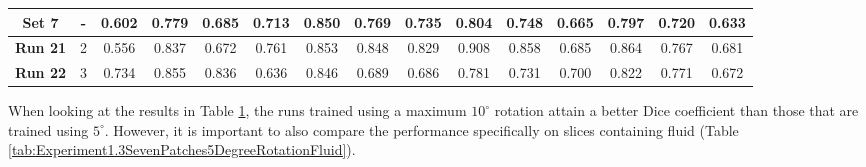 \begin{table}[!ht]
{\begin{tabular}{|c|c|ccc|ccc|ccc|c|c|c|c|}
		\hline
		
		\textbf{Set 7} & - & \multicolumn{1}{c|}{0.602} & \multicolumn{1}{c|}{0.779} & 0.685 & \multicolumn{1}{c|}{0.713} & \multicolumn{1}{c|}{0.850} & 0.769 & \multicolumn{1}{c|}{0.735} & \multicolumn{1}{c|}{0.804} & 0.748 & 0.665 & 0.797 & 0.720 & 0.633 \\
		
		\hline
		\hline
		
		\textbf{Run 21} & 2 & \multicolumn{1}{c|}{0.556} & \multicolumn{1}{c|}{0.837} & 0.672 & \multicolumn{1}{c|}{0.761} & \multicolumn{1}{c|}{0.853} & 0.848 & \multicolumn{1}{c|}{0.829} & \multicolumn{1}{c|}{0.908} & 0.858 & 0.685 & 0.864 & 0.767 & 0.681 \\

		\textbf{Run 22} & 3 & \multicolumn{1}{c|}{0.734} & \multicolumn{1}{c|}{0.855} & 0.836 & \multicolumn{1}{c|}{0.636} & \multicolumn{1}{c|}{0.846} & 0.689 & \multicolumn{1}{c|}{0.686} & \multicolumn{1}{c|}{0.781} & 0.731 & 0.700 & 0.822 & 0.771 & 0.672 \\

		\hline
			
	\end{tabular}}
	\label{tab:Experiment1.3SevenPatches5DegreeRotation}
\end{table}

When looking at the results in Table \ref{tab:Experiment1.3SevenPatches5DegreeRotation}, the runs trained using a maximum $10^{\circ}$ rotation attain a better Dice coefficient than those that are trained using $5^{\circ}$. However, it is important to also compare the performance specifically on slices containing fluid (Table \ref{tab:Experiment1.3SevenPatches5DegreeRotationFluid}).

